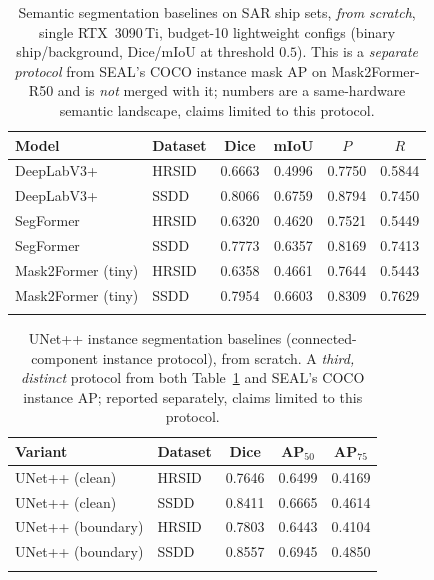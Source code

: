 \begin{table}[t]
\centering
\caption{Semantic segmentation baselines on SAR ship sets, \emph{from scratch}, single RTX~3090\,Ti, budget-10 lightweight configs (binary ship/background, Dice/mIoU at threshold $0.5$). This is a \emph{separate protocol} from SEAL's COCO instance mask AP on Mask2Former-R50 and is \emph{not} merged with it; numbers are a same-hardware semantic landscape, claims limited to this protocol.}
\label{tab:seg-semantic}
\begin{tabular}{@{}llcccc@{}}
\toprule
Model & Dataset & Dice & mIoU & $P$ & $R$ \\
\midrule
DeepLabV3+ & HRSID & 0.6663 & 0.4996 & 0.7750 & 0.5844 \\
DeepLabV3+ & SSDD & 0.8066 & 0.6759 & 0.8794 & 0.7450 \\
\addlinespace
SegFormer & HRSID & 0.6320 & 0.4620 & 0.7521 & 0.5449 \\
SegFormer & SSDD & 0.7773 & 0.6357 & 0.8169 & 0.7413 \\
\addlinespace
Mask2Former (tiny) & HRSID & 0.6358 & 0.4661 & 0.7644 & 0.5443 \\
Mask2Former (tiny) & SSDD & 0.7954 & 0.6603 & 0.8309 & 0.7629 \\
\addlinespace
\bottomrule
\end{tabular}
\end{table}

\begin{table}[t]
\centering
\caption{UNet++ instance segmentation baselines (connected-component instance protocol), from scratch. A \emph{third, distinct} protocol from both Table~\ref{tab:seg-semantic} and SEAL's COCO instance AP; reported separately, claims limited to this protocol.}
\label{tab:seg-instance}
\begin{tabular}{@{}llccc@{}}
\toprule
Variant & Dataset & Dice & AP$_{50}$ & AP$_{75}$ \\
\midrule
UNet++ (clean) & HRSID & 0.7646 & 0.6499 & 0.4169 \\
UNet++ (clean) & SSDD & 0.8411 & 0.6665 & 0.4614 \\
\addlinespace
UNet++ (boundary) & HRSID & 0.7803 & 0.6443 & 0.4104 \\
UNet++ (boundary) & SSDD & 0.8557 & 0.6945 & 0.4850 \\
\addlinespace
\bottomrule
\end{tabular}
\end{table}